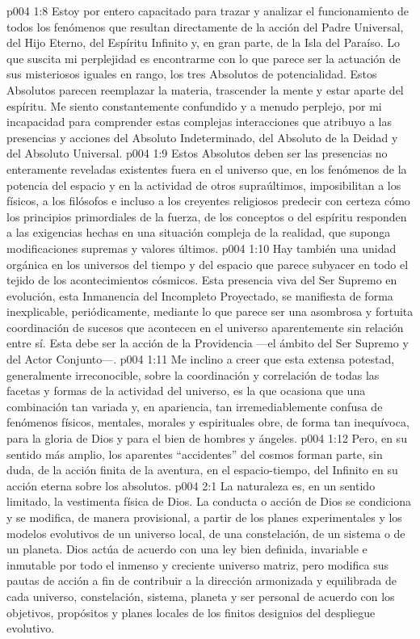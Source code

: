 \vs p004 1:8 Estoy por entero capacitado para trazar y analizar el funcionamiento de todos los fenómenos que resultan directamente de la acción del Padre Universal, del Hijo Eterno, del Espíritu Infinito y, en gran parte, de la Isla del Paraíso. Lo que suscita mi perplejidad es encontrarme con lo que parece ser la actuación de sus misteriosos iguales en rango, los tres Absolutos de potencialidad. Estos Absolutos parecen reemplazar la materia, trascender la mente y estar aparte del espíritu. Me siento constantemente confundido y a menudo perplejo, por mi incapacidad para comprender estas complejas interacciones que atribuyo a las presencias y acciones del Absoluto Indeterminado, del Absoluto de la Deidad y del Absoluto Universal.
\vs p004 1:9 Estos Absolutos deben ser las presencias no enteramente reveladas existentes fuera en el universo que, en los fenómenos de la potencia del espacio y en la actividad de otros supraúltimos, imposibilitan a los físicos, a los filósofos e incluso a los creyentes religiosos predecir con certeza cómo los principios primordiales de la fuerza, de los conceptos o del espíritu responden a las exigencias hechas en una situación compleja de la realidad, que suponga modificaciones supremas y valores últimos.
\vs p004 1:10 \pc Hay también una unidad orgánica en los universos del tiempo y del espacio que parece subyacer en todo el tejido de los acontecimientos cósmicos. Esta presencia viva del Ser Supremo en evolución, esta Inmanencia del Incompleto Proyectado, se manifiesta de forma inexplicable, periódicamente, mediante lo que parece ser una asombrosa y fortuita coordinación de sucesos que acontecen en el universo aparentemente sin relación entre sí. Esta debe ser la acción de la Providencia ---el ámbito del Ser Supremo y del Actor Conjunto---.
\vs p004 1:11 Me inclino a creer que esta extensa potestad, generalmente irreconocible, sobre la coordinación y correlación de todas las facetas y formas de la actividad del universo, es la que ocasiona que una combinación tan variada y, en apariencia, tan irremediablemente confusa de fenómenos físicos, mentales, morales y espirituales obre, de forma tan inequívoca, para la gloria de Dios y para el bien de hombres y ángeles.
\vs p004 1:12 Pero, en su sentido más amplio, los aparentes “accidentes” del cosmos forman parte, sin duda, de la acción finita de la aventura, en el espacio\hyp{}tiempo, del Infinito en su acción eterna sobre los absolutos.
\vs p004 2:1 La naturaleza es, en un sentido limitado, la vestimenta física de Dios. La conducta o acción de Dios se condiciona y se modifica, de manera provisional, a partir de los planes experimentales y los modelos evolutivos de un universo local, de una constelación, de un sistema o de un planeta. Dios actúa de acuerdo con una ley bien definida, invariable e inmutable por todo el inmenso y creciente universo matriz, pero modifica sus pautas de acción a fin de contribuir a la dirección armonizada y equilibrada de cada universo, constelación, sistema, planeta y ser personal de acuerdo con los objetivos, propósitos y planes locales de los finitos designios del despliegue evolutivo.
